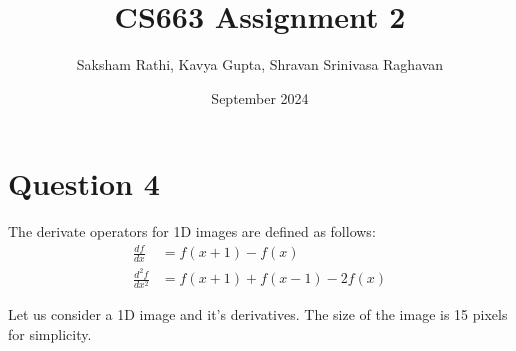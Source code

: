 \documentclass[12pt]{article}
\title{{\bf CS663 Assignment 2}}
\author{Saksham Rathi, Kavya Gupta, Shravan Srinivasa Raghavan}
\date{September 2024}
\begin{document}
\maketitle
\clearpage
\tableofcontents
\clearpage
\section*{Question 4}
    The derivate operators for 1D images are defined as follows:
    \begin{align*}
        \frac{df}{dx} &= f(x + 1) - f(x) \\
        \frac{d^{2}f}{dx^{2}} &= f(x + 1) + f(x - 1) - 2f(x) 
    \end{align*}

    Let us consider a 1D image and it's derivatives. The size of the image is 15 pixels for simplicity.
\end{document}
